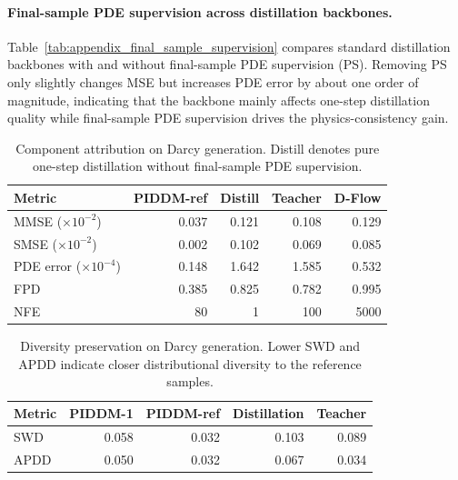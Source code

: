 \documentclass{article}
\theoremstyle{plain}
\theoremstyle{definition}
\theoremstyle{remark}
\begin{document}
\paragraph{Final-sample PDE supervision across distillation backbones.} Table~\ref{tab:appendix_final_sample_supervision} compares standard distillation backbones with and without final-sample PDE supervision (PS). Removing PS only slightly changes MSE but increases PDE error by about one order of magnitude, indicating that the backbone mainly affects one-step distillation quality while final-sample PDE supervision drives the physics-consistency gain.

\begin{table}[!htbp]
\centering
\setlength{\tabcolsep}{4pt}
\renewcommand{\arraystretch}{1.15}
\caption{Component attribution on Darcy generation. Distill denotes pure one-step distillation without final-sample PDE supervision.}
\label{tab:appendix_component_attribution}
\begin{tabular}{lrrrr}
\toprule
Metric & PIDDM-ref & Distill & Teacher & D-Flow \\
\midrule
MMSE ($\times 10^{-2}$) & 0.037 & 0.121 & 0.108 & 0.129 \\
SMSE ($\times 10^{-2}$) & 0.002 & 0.102 & 0.069 & 0.085 \\
PDE error ($\times 10^{-4}$) & 0.148 & 1.642 & 1.585 & 0.532 \\
FPD & 0.385 & 0.825 & 0.782 & 0.995 \\
NFE & 80 & 1 & 100 & 5000 \\
\bottomrule
\end{tabular}
\end{table}

\begin{table}[!htbp]
\centering
\setlength{\tabcolsep}{4pt}
\renewcommand{\arraystretch}{1.15}
\caption{Diversity preservation on Darcy generation. Lower SWD and APDD indicate closer distributional diversity to the reference samples.}
\label{tab:appendix_diversity}
\begin{tabular}{lrrrr}
\toprule
Metric & PIDDM-1 & PIDDM-ref & Distillation & Teacher \\
\midrule
SWD & 0.058 & 0.032 & 0.103 & 0.089 \\
APDD & 0.050 & 0.032 & 0.067 & 0.034 \\
\bottomrule
\end{tabular}
\end{table}
\end{document}
